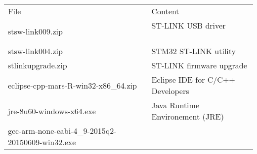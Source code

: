 \begin{longtable}[]{@{}ll@{}}
\toprule
\begin{minipage}[t]{0.47\columnwidth}\raggedright\strut
{File}\strut
\end{minipage} & \begin{minipage}[t]{0.47\columnwidth}\raggedright\strut
{Content}\strut
\end{minipage}\tabularnewline
\begin{minipage}[t]{0.47\columnwidth}\raggedright\strut
{stsw-link009.zip }\strut
\end{minipage} & \begin{minipage}[t]{0.47\columnwidth}\raggedright\strut
{ST-LINK USB driver ~ ~ ~ ~ ~ ~ ~ }\strut
\end{minipage}\tabularnewline
\begin{minipage}[t]{0.47\columnwidth}\raggedright\strut
{stsw-link004.zip}\strut
\end{minipage} & \begin{minipage}[t]{0.47\columnwidth}\raggedright\strut
{STM32 ST-LINK utility}\strut
\end{minipage}\tabularnewline
\begin{minipage}[t]{0.47\columnwidth}\raggedright\strut
{stlinkupgrade.zip }\strut
\end{minipage} & \begin{minipage}[t]{0.47\columnwidth}\raggedright\strut
{ST-LINK firmware upgrade}\strut
\end{minipage}\tabularnewline
\begin{minipage}[t]{0.47\columnwidth}\raggedright\strut
{eclipse-cpp-mars-R-win32-x86\_64.zip}\strut
\end{minipage} & \begin{minipage}[t]{0.47\columnwidth}\raggedright\strut
{Eclipse IDE for C/C++ Developers}\strut
\end{minipage}\tabularnewline
\begin{minipage}[t]{0.47\columnwidth}\raggedright\strut
{jre-8u60-windows-x64.exe}\strut
\end{minipage} & \begin{minipage}[t]{0.47\columnwidth}\raggedright\strut
{Java Runtime Environement (JRE)}\strut
\end{minipage}\tabularnewline
\begin{minipage}[t]{0.47\columnwidth}\raggedright\strut
{gcc-arm-none-eabi-4\_9-2015q2-20150609-win32.exe}\strut
\end{minipage} & \begin{minipage}[t]{0.47\columnwidth}\raggedright\strut

\end{minipage}
\end{longtable}
